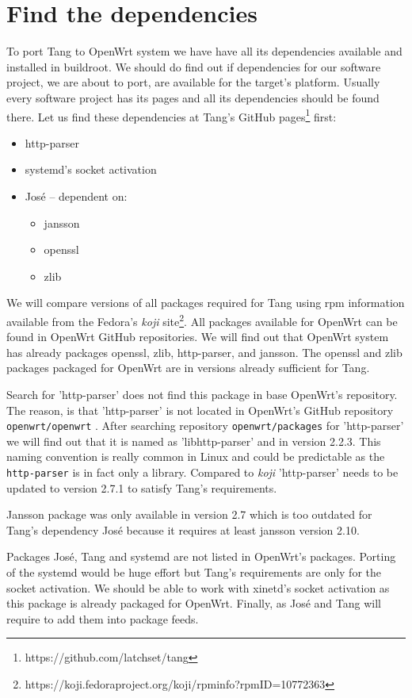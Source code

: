 \section{Find the dependencies}\label{dependencies}

To port Tang to OpenWrt system we have have all its dependencies available and installed in buildroot.
We should do find out if dependencies for our software project, we are about to port, are available for the target's platform.
Usually every software project has its pages and all its dependencies should be found there.
Let us find these dependencies at Tang's GitHub pages\footnote{https://github.com/latchset/tang} first:
\begin{itemize}
\item http-parser
\item systemd's socket activation
\item José -- dependent on:
    \begin{itemize}
    \item jansson
    \item openssl
    \item zlib
    \end{itemize}
\end{itemize}
We will compare versions of all packages required for Tang using rpm information available from the Fedora's {\it koji} site\footnote{https://koji.fedoraproject.org/koji/rpminfo?rpmID=10772363}.
All packages available for OpenWrt can be found in OpenWrt GitHub repositories.
We will find out that OpenWrt system has already packages openssl, zlib, http-parser, and jansson.
The openssl and zlib packages packaged for OpenWrt are in versions already sufficient for Tang.

Search for 'http-parser' does not find this package in base OpenWrt's repository.
The reason, is that 'http-parser' is not located in OpenWrt's GitHub repository {\tt openwrt/openwrt} .
After searching repository {\tt openwrt/packages} for 'http-parser' we will find out that it is named as 'libhttp-parser' and in version 2.2.3.
This naming convention is really common in Linux and could be predictable as the {\tt http-parser} is in fact only a library.
Compared to {\it koji} 'http-parser' needs to be updated to version 2.7.1 to satisfy Tang's requirements.

Jansson package was only available in version 2.7 which is too outdated for Tang's dependency José because it requires at least jansson version 2.10.

Packages José, Tang and systemd are not listed in OpenWrt's packages.
Porting of the systemd would be huge effort but Tang's requirements are only for the socket activation.
We should be able to work with xinetd's socket activation as this package is already packaged for OpenWrt.
Finally, as José and Tang will require to add them into package feeds.

